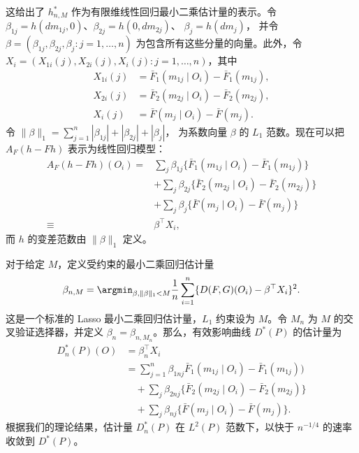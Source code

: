这给出了 $h_{n,M}^*$ 作为有限维线性回归最小二乘估计量的表示。令
$\beta_{1j}=h(dm_{1j},0)$、$\beta_{2j}=h(0,dm_{2j})$、
$\beta_j=h(dm_j)$，
并令 $\beta=(\beta_{1j},\beta_{2j},\beta_j:j=1,\ldots,n)$ 为包含所有这些分量的向量。此外，令
$X_i=(X_{1i}(j),X_{2i}(j),X_i(j):j=1,\ldots,n)$，其中
\[
 \begin{aligned}
 X_{1i}(j)&=\bar F_1(m_{1j}\mid O_i)-\bar F_1(m_{1j}),\\
 X_{2i}(j)&=\bar F_2(m_{2j}\mid O_i)-\bar F_2(m_{2j}),\\
 X_i(j)&=\bar F(m_j\mid O_i)-\bar F(m_j).
 \end{aligned}
\]
令 $\|\beta\|_1=\sum_{j=1}^n|\beta_{1j}|+|\beta_{2j}|+|\beta_j|$，
为系数向量 $\beta$ 的 $L_1$ 范数。现在可以把 $A_F(h-Fh)$ 表示为线性回归模型：
\[
 \begin{aligned}
 A_F(h-Fh)(O_i)={}&\sum_j\beta_{1j}
 \{\bar F_1(m_{1j}\mid O_i)-\bar F_1(m_{1j})\}\\
 &+\sum_j\beta_{2j}
 \{\bar F_2(m_{2j}\mid O_i)-\bar F_2(m_{2j})\}\\
 &+\sum_j\beta_j\{\bar F(m_j\mid O_i)-\bar F(m_j)\}\\
 \equiv{}&\beta^\top X_i,
 \end{aligned}
\]
而 $h$ 的变差范数由 $\|\beta\|_1$ 定义。

对于给定 $M$，定义受约束的最小二乘回归估计量
\[
 \beta_{n,M}=\argmin_{\beta,\|\beta\|_1<M}\frac1n\sum_{i=1}^n
 \{D(F,G)(O_i)-\beta^\top X_i\}^2.
\]
这是一个标准的 Lasso 最小二乘回归估计量，$L_1$ 约束设为 $M$。令 $M_n$ 为 $M$ 的交叉验证选择器，并定义 $\beta_n=\beta_{n,M_n}$。那么，有效影响曲线 $D^*(P)$ 的估计量为
\[
 \begin{aligned}
 D_n^*(P)(O)&=\beta_n^\top X_i\\
 &=\sum_{j=1}^n\beta_{1nj}\bar F_1(m_{1j}\mid O_i)-\bar F_1(m_{1j}))\\
 &\quad+\sum_j\beta_{2nj}\{\bar F_2(m_{2j}\mid O_i)-\bar F_2(m_{2j})\}\\
 &\quad+\sum_j\beta_{nj}\{\bar F(m_j\mid O_i)-\bar F(m_j)\}.
 \end{aligned}
\]
根据我们的理论结果，估计量 $D_n^*(P)$ 在 $L^2(P)$ 范数下，以快于 $n^{-1/4}$ 的速率收敛到 $D^*(P)$。

